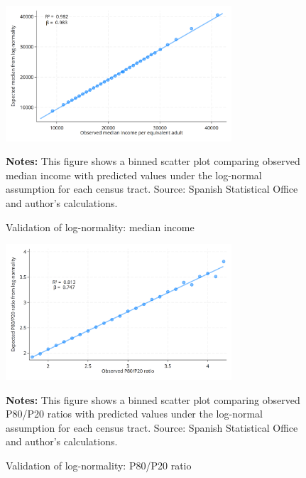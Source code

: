 \begin{figure}[H]
\begin{center}
\captionsetup{justification=centering}
\caption{Validation of log-normality: median income}
\label{fig:median}
\includegraphics[width=0.75\textwidth]{output/binned_scatter_median.png}
\end{center}
\begin{fignotes2}
\textbf{Notes:} This figure shows a binned scatter plot comparing observed median income with predicted values under the log-normal assumption for each census tract. Source: Spanish Statistical Office and author's calculations.
\end{fignotes2}
\end{figure}

\begin{figure}[H]
\begin{center}
\captionsetup{justification=centering}
\caption{Validation of log-normality: P80/P20 ratio}
\label{fig:p80p20}
\includegraphics[width=0.75\textwidth]{output/binned_scatter_p80p20.png}
\end{center}
\begin{fignotes2}
\textbf{Notes:} This figure shows a binned scatter plot comparing observed P80/P20 ratios with predicted values under the log-normal assumption for each census tract. Source: Spanish Statistical Office and author's calculations.
\end{fignotes2}
\end{figure}

